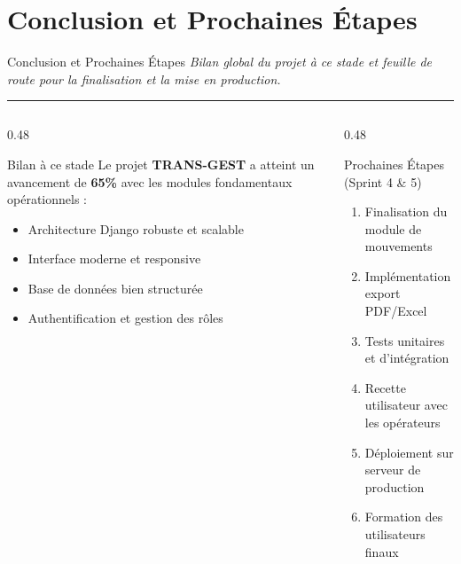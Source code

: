\documentclass[
  aspectratio=169,       %
  xcolor=dvipsnames,     %
  t                      %
]{beamer}
\newcommand{\framedesc}[1]{%
  {\small\itshape\textcolor{PrimaryDark!80}{#1}}\par%
  \vspace{1pt}%
  {\color{PrimaryMid}\rule{\textwidth}{0.4pt}}%
  \vspace{4pt}%
}
\begin{document}
\section{Conclusion et Prochaines Étapes}

\begin{frame}{Conclusion et Prochaines Étapes}
  \framedesc{Bilan global du projet à ce stade et feuille de route pour la finalisation et la mise en production.}

  \begin{columns}[T]

    \begin{column}{0.48\textwidth}
      \begin{block}{Bilan à ce stade}
        Le projet \textbf{TRANS-GEST} a atteint un avancement de
        \textbf{65\%} avec les modules fondamentaux opérationnels :
        \begin{itemize}
          \item Architecture Django robuste et scalable
          \item Interface moderne et responsive
          \item Base de données bien structurée
          \item Authentification et gestion des rôles
        \end{itemize}
      \end{block}
    \end{column}

    \begin{column}{0.48\textwidth}
      \begin{exampleblock}{Prochaines Étapes (Sprint 4 \& 5)}
        \begin{enumerate}
          \item Finalisation du module de mouvements
          \item Implémentation export PDF/Excel
          \item Tests unitaires et d'intégration
          \item Recette utilisateur avec les opérateurs
          \item Déploiement sur serveur de production
          \item Formation des utilisateurs finaux
        \end{enumerate}
      \end{exampleblock}
    \end{column}


\end{columns}
\end{frame}
\end{document}

